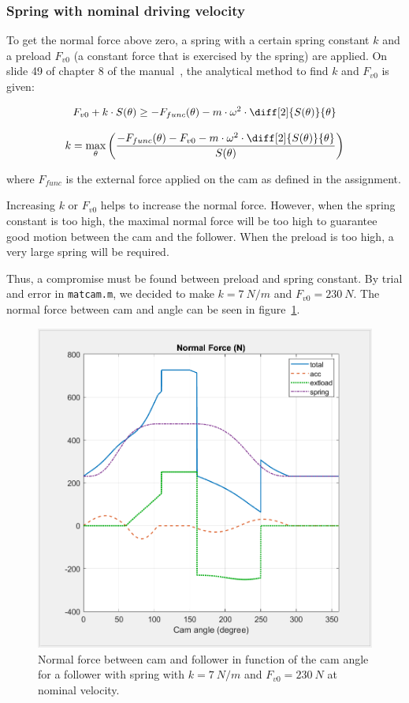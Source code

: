 \documentclass[a4paper]{article}
\begin{document}
\subsubsection{Spring with nominal driving velocity}

To get the normal force above zero, a spring with a certain spring constant \(k\) and a preload \(F_{v0}\) (a constant force that is exercised by the spring) are applied. On slide 49 of chapter 8 of the manual~\cite{cursus}, the analytical method to find \(k\) and \(F_{v0}\) is given:

\begin{equation}
	F_{v0} + k\cdot S(\theta) \geq -F_{func}(\theta) -m\cdot\omega^2\cdot\diff[2]{S(\theta)}{\theta}
\end{equation}

\begin{equation}
	k = \max_\theta\left(\frac{-F_{func}(\theta)-F_{v0}-m\cdot\omega^2\cdot\diff[2]{S(\theta)}{\theta}}{S(\theta)}\right)
\end{equation}

where \(F_{func}\) is the external force applied on the cam as defined in the assignment.

Increasing \(k\) or \(F_{v0}\) helps to increase the normal force. However, when the spring constant is too high, the maximal normal force will be too high to guarantee good motion between the cam and the follower. When the preload is too high, a very large spring will be required.

Thus, a compromise must be found between preload and spring constant. By trial and error in \texttt{matcam.m}, we decided to make \(k = 7~N/m\) and \(F_{v0} = 230~N\). The normal force between cam and angle can be seen in figure~\ref{fig:Nmetveer}.

\begin{figure}
	\centering
	\includegraphics[width=.7\textwidth]{Nmetveer.png}
	\caption{Normal force between cam and follower in function of the cam angle for a follower with spring with \(k=7~N/m\) and \(F_{v0}=230~N\) at nominal velocity.}
	\label{fig:Nmetveer}
\end{figure}
\end{document}
